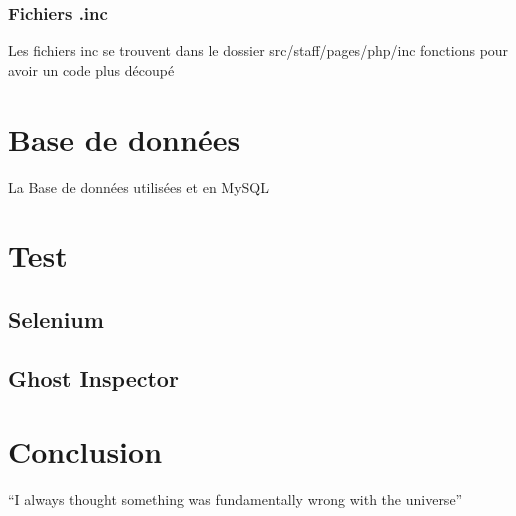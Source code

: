 \documentclass{article}
\begin{document}
\subsubsection{Fichiers .inc}
Les fichiers inc se trouvent dans le dossier src/staff/pages/php/inc
fonctions pour avoir un code plus découpé


\section{Base de données}
La Base de données utilisées et en MySQL

\section{Test}
\subsection{Selenium}

\subsection{Ghost Inspector}

\section{Conclusion}
``I always thought something was fundamentally wrong with the universe'' \citep{adams1995hitchhiker}



\end{document}
